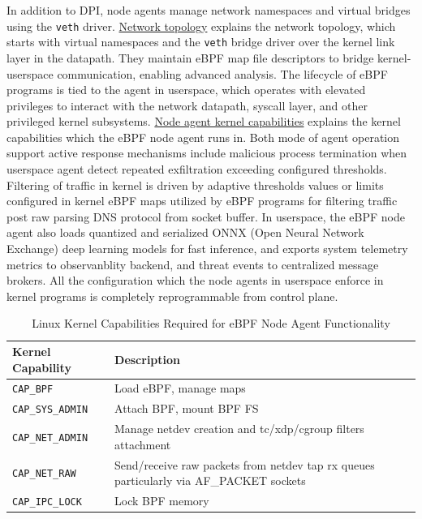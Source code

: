 \documentclass [11pt, proquest] {uwthesis}[2020/02/24]
\begin{document}
In addition to DPI, node agents manage network namespaces and virtual bridges using the \texttt{veth} driver. \hyperref[sec:dp_eBPF_agent_net_topology]{Network topology} explains the network topology, which starts with virtual namespaces and the \texttt{veth} bridge driver over the kernel link layer in the datapath. They maintain eBPF map file descriptors to bridge kernel-userspace communication, enabling advanced analysis. The lifecycle of eBPF programs is tied to the agent in userspace, which operates with elevated privileges to interact with the network datapath, syscall layer, and other privileged kernel subsystems. \hyperref[sec:dp_kernel_cap]{Node agent kernel capabilities} explains the kernel capabilities which the eBPF node agent runs in. Both mode of agent operation support active response mechanisms include malicious process termination when userspace agent detect repeated exfiltration exceeding configured thresholds. Filtering of traffic in kernel is driven by adaptive thresholds values or limits configured in kernel eBPF maps utilized by eBPF programs for filtering traffic post raw parsing DNS protocol from socket buffer. In userspace, the eBPF node agent also loads quantized and serialized ONNX (Open Neural Network Exchange) deep learning models for fast inference, and exports system telemetry metrics to observanblity backend, and threat events to centralized message brokers. All the configuration which the node agents in userspace enforce in kernel programs is completely reprogrammable from control plane.


\vspace{1em}
\begin{minipage}{\textwidth}
\begin{table}[H]
\centering
\begin{tabular}{|l|p{10cm}|}
\hline
\textbf{Kernel Capability} & \textbf{Description} \\
\hline
\texttt{CAP\_BPF} & Load eBPF, manage maps \\
\hline
\texttt{CAP\_SYS\_ADMIN} & Attach BPF, mount BPF FS \\
\hline
\texttt{CAP\_NET\_ADMIN} & Manage netdev creation and tc/xdp/cgroup filters attachment \\
\hline
\texttt{CAP\_NET\_RAW} & Send/receive raw packets from netdev tap rx queues particularly via AF\_PACKET sockets  \\
\hline
\texttt{CAP\_IPC\_LOCK} & Lock BPF memory \\
\hline
\end{tabular}
\caption{Linux Kernel Capabilities Required for eBPF Node Agent Functionality}
\label{sec:dp_kernel_cap}
\end{table}
\end{minipage}
\end{document}
